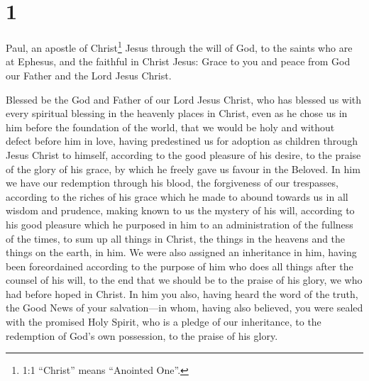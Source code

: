 \hypertarget{section}{%
\section{1}\label{section}}

 Paul, an apostle of Christ\footnote{1:1 ``Christ'' means
  ``Anointed One''.} Jesus through the will of God, to the saints who
are at Ephesus, and the faithful in Christ Jesus:  Grace to
you and peace from God our Father and the Lord Jesus Christ.

 Blessed be the God and Father of our Lord Jesus Christ, who
has blessed us with every spiritual blessing in the heavenly places in
Christ,  even as he chose us in him before the foundation of
the world, that we would be holy and without defect before him in love,
 having predestined us for adoption as children through
Jesus Christ to himself, according to the good pleasure of his desire,
 to the praise of the glory of his grace, by which he freely
gave us favour in the Beloved.  In him we have our
redemption through his blood, the forgiveness of our trespasses,
according to the riches of his grace  which he made to
abound towards us in all wisdom and prudence,  making known
to us the mystery of his will, according to his good pleasure which he
purposed in him  to an administration of the fullness of
the times, to sum up all things in Christ, the things in the heavens and
the things on the earth, in him.  We were also assigned an
inheritance in him, having been foreordained according to the purpose of
him who does all things after the counsel of his will,  to
the end that we should be to the praise of his glory, we who had before
hoped in Christ.  In him you also, having heard the word of
the truth, the Good News of your salvation---in whom, having also
believed, you were sealed with the promised Holy Spirit, 
who is a pledge of our inheritance, to the redemption of God's own
possession, to the praise of his glory.

